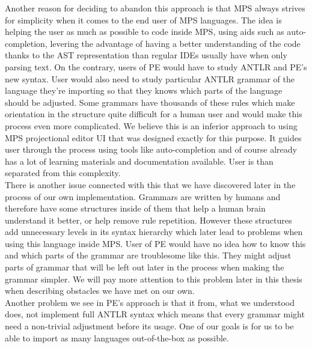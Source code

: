 Another reason for deciding to abandon this approach is that MPS always strives for simplicity when it comes to the end user of MPS languages. The idea is helping the user as much as possible to code inside MPS, using aids such as auto-completion, levering the advantage of having a better understanding of the code thanks to the AST representation than regular IDEs usually have when only parsing text. On the contrary, users of PE would have to study ANTLR and PE's new syntax. User would also need to study particular ANTLR grammar of the language they're importing so that they knows which parts of the language should be adjusted. Some grammars have thousands of these rules which make orientation in the structure quite difficult for a human user and would make this process even more complicated. We believe this is an inferior approach to using MPS projectional editor UI that was designed exactly for this purpose. It guides user through the process using tools like auto-completion and of course already has a lot of learning materials and documentation available. User is than separated from this complexity. 
\\

There is another issue connected with this that we have discovered later in the process of our own implementation. Grammars are written by humans and therefore have some structures inside of them that help a human brain understand it better, or help remove rule repetition. However these structures add unnecessary levels in its syntax hierarchy which later lead to problems when using this language inside MPS. User of PE would have no idea how to know this and which parts of the grammar are troublesome like this. They might adjust parts of grammar that will be left out later in the process when making the grammar simpler. We will pay more attention to this problem later in this thesis when describing obstacles we have met on our own.
\\

Another problem we see in PE's approach is that it from, what we understood does, not implement full ANTLR syntax which means that every grammar might need a non-trivial adjustment before its usage. One of our goals is for us to be able to import as many languages out-of-the-box as possible.
\\

